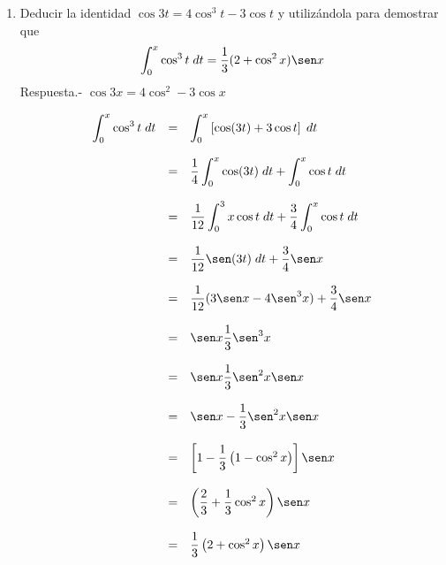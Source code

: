 \begin{enumerate}
\begin{enumerate}[\bfseries (a)]
	\item Deducir la identidad $\cos 3t = 4\cos^3 t - 3\cos t$ y utilizándola para demostrar que 
	    $$\int_0^x \cos^3 t \; dt = \frac{1}{3}(2+\cos^2 x)\sen x$$
	    Respuesta.-\; $\cos3 x = 4\cos^2 - 3\cos x$

	    $$\begin{array}{rcl}
		\displaystyle\int_0^x \cos^3 t\; dt&=&\displaystyle\int_0^x \left[\cos(3t) + 3\cos t\right]\; dt\\\\
						   &=&\dfrac{1}{4}\displaystyle\int_0^x \cos(3t)\; dt + \displaystyle\int_0^x \cos t \; dt\\\\
						   &=&\dfrac{1}{12}\displaystyle\int_0^3x \cos t \; dt + \dfrac{3}{4}\displaystyle\int_0^x \cos t \; dt\\\\
						   &=&\dfrac{1}{12} \sen(3t) \; dt + \dfrac{3}{4}\sen x\\\\
						   &=&\dfrac{1}{12}(3\sen x - 4 \sen^3 x) + \dfrac{3}{4}\sen x\\\\
						   &=&\sen x \dfrac{1}{3}\sen^3 x\\\\
						   &=&\sen x \dfrac{1}{3}\sen^2x \sen x\\\\
						   &=&\sen x - \dfrac{1}{3}\sen^2x \sen x\\\\
						   &=&\left[1 - \dfrac{1}{3}\left(1-\cos^2 x\right)\right]\sen x\\\\
						   &=&\left(\dfrac{2}{3}+\dfrac{1}{3}\cos^2 x\right)\sen x\\\\
						   &=&\dfrac{1}{3}\left(2+\cos^2 x\right)\sen x\\\\
		\end{array}$$

    \end{enumerate}


\end{enumerate}
